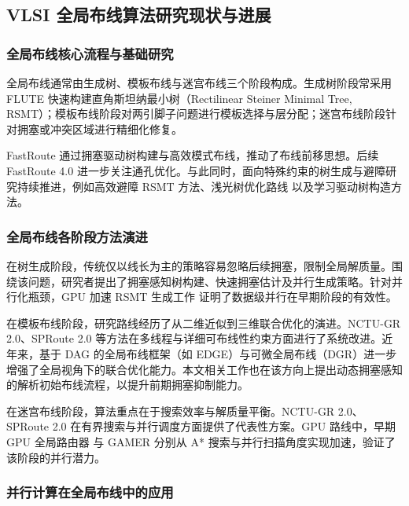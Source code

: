 \subsection{VLSI 全局布线算法研究现状与进展}

\subsubsection{全局布线核心流程与基础研究}

全局布线通常由生成树、模板布线与迷宫布线三个阶段构成。生成树阶段常采用 FLUTE\cite{10.1109/TCAD.2007.907068} 快速构建直角斯坦纳最小树（Rectilinear Steiner Minimal Tree, RSMT）；模板布线阶段对两引脚子问题进行模板选择与层分配；迷宫布线阶段针对拥塞或冲突区域进行精细化修复。

FastRoute\cite{10.1145/1233501.1233596} 通过拥塞驱动树构建与高效模式布线，推动了布线前移思想。后续 FastRoute 4.0\cite{10.5555/1509633.1509768} 进一步关注通孔优化。与此同时，面向特殊约束的树生成与避障研究持续推进，例如高效避障 RSMT 方法\cite{Guo2024ARH}、浅光树优化路线\cite{10.5555/3199700.3199776} 以及学习驱动树构造方法\cite{10.1145/3394885.3431566}。

\subsubsection{全局布线各阶段方法演进}

在树生成阶段，传统仅以线长为主的策略容易忽略后续拥塞，限制全局解质量。围绕该问题，研究者提出了拥塞感知树构建、快速拥塞估计及并行生成策略。针对并行化瓶颈，GPU 加速 RSMT 生成工作\cite{10.1145/3508352.3549434} 证明了数据级并行在早期阶段的有效性。

在模板布线阶段，研究路线经历了从二维近似到三维联合优化的演进。NCTU-GR 2.0\cite{Liu2013NCTUGR2M}、SPRoute 2.0\cite{10.1109/ASP-DAC52403.2022.9712557} 等方法在多线程与详细可布线性约束方面进行了系统改进。近年来，基于 DAG 的全局布线框架（如 EDGE\cite{10.1109/DAC56929.2023.10247702}）与可微全局布线（DGR\cite{10.1145/3649329.3656530}）进一步增强了全局视角下的联合优化能力。本文相关工作也在该方向上提出动态拥塞感知的解析初始布线流程\cite{11017940}，以提升前期拥塞抑制能力。

在迷宫布线阶段，算法重点在于搜索效率与解质量平衡。NCTU-GR 2.0\cite{Liu2013NCTUGR2M}、SPRoute 2.0\cite{10.1109/ASP-DAC52403.2022.9712557} 在有界搜索与并行调度方面提供了代表性方案。GPU 路线中，早期 GPU 全局路由器\cite{6657028} 与 GAMER\cite{9643563} 分别从 A* 搜索与并行扫描角度实现加速，验证了该阶段的并行潜力。

\subsubsection{并行计算在全局布线中的应用}

